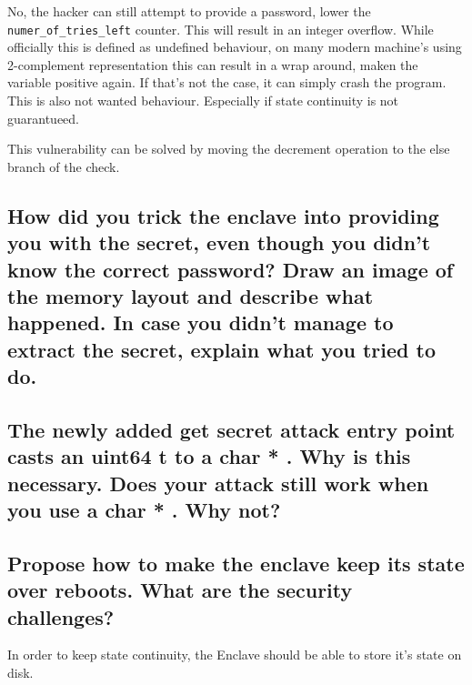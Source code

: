 \documentclass{article}
\begin{document}
No, the hacker can still attempt to provide a password, lower the
\texttt{numer\_of\_tries\_left} counter. This will result in an integer
overflow. While officially this is defined as undefined behaviour, on many
modern machine's using 2-complement representation this can result in a wrap
around, maken the variable positive again. If that's not the case, it can simply
crash the program. This is also not wanted behaviour. Especially if state
continuity is not guarantueed.

This vulnerability can be solved by moving the decrement operation to the else
branch of the check.

\subsection{How did you trick the enclave into providing you with the secret, even
  though you didn’t know the correct password?   Draw an image of the
  memory layout and describe what happened.  In case you didn’t manage
to extract the secret, explain what you tried to do.}
\subsection{The newly added
  get
  secret
  attack
  entry point casts an
  uint64
  t
  to
  a
  char *
  .  Why is this necessary.  Does your attack still work when you
  use a
  char *
  .  Why not?  }
\subsection{Propose how to make the enclave keep its state over reboots.  What are
the security challenges?}

In order to keep state continuity, the Enclave should be able to store it's
state on disk.
\end{document}
